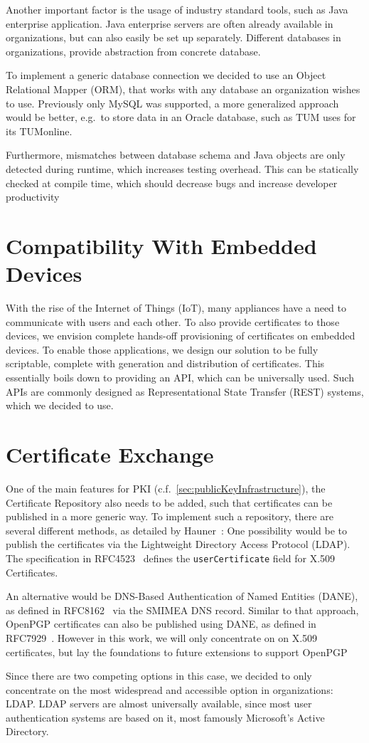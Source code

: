 Another important factor is the usage of industry standard tools, such as Java enterprise application.
Java enterprise servers are often already available in organizations, but can also easily be set up separately.
Different databases in organizations, provide abstraction from concrete database.

To implement a generic database connection we decided to use an Object Relational Mapper (ORM), that works with any
database an organization wishes to use.
Previously only MySQL was supported, a more generalized approach would be better, e.g.\ to store data in an Oracle
database, such as TUM uses for its TUMonline.

Furthermore, mismatches between database schema and Java objects are only detected during runtime, which increases
testing overhead.
This can be statically checked at compile time, which should decrease bugs and increase developer productivity

\section{Compatibility With Embedded Devices}\label{sec:compatibilityWithEmbeddedDevices}
With the rise of the Internet of Things (IoT), many appliances have a need to communicate with users and each other.
To also provide certificates to those devices, we envision complete hands-off provisioning of certificates on embedded
devices.
To enable those applications, we design our solution to be fully scriptable, complete with generation and distribution
of certificates.
This essentially boils down to providing an API, which can be universally used.
Such APIs are commonly designed as Representational State Transfer (REST) systems, which we decided to use.

\section{Certificate Exchange}\label{sec:certificateExchange}
One of the main features for PKI (c.f.~\ref{sec:publicKeyInfrastructure}), the Certificate Repository also needs to be
added, such that certificates can be published in a more generic way.
To implement such a repository, there are several different methods, as detailed by
Hauner~\cite{hauner2016interoperability}:
One possibility would be to publish the certificates via the Lightweight Directory Access Protocol (LDAP).
The specification in RFC4523~\cite{RFC4523} defines the \lstinline{userCertificate} field for X.509 Certificates.

An alternative would be DNS-Based Authentication of Named Entities (DANE), as defined in RFC8162~\cite{RFC8162} via the
SMIMEA DNS record.
Similar to that approach, OpenPGP certificates can also be published using DANE, as defined in RFC7929~\cite{RFC7929}.
However in this work, we will only concentrate on on X.509 certificates, but lay the foundations to future extensions
to support OpenPGP

Since there are two competing options in this case, we decided to only concentrate on the most widespread and accessible
option in organizations: LDAP\@.
LDAP servers are almost universally available, since most user authentication systems are based on it, most famously
Microsoft's Active Directory.
